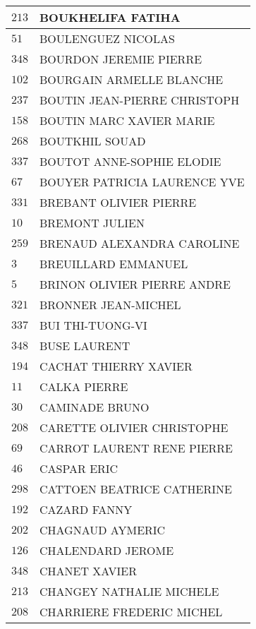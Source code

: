 \begin{xltabular}{\linewidth}{|l|X|}
    \hline
    $213$ & BOUKHELIFA FATIHA \\
    \hline
    $51$ & BOULENGUEZ NICOLAS \\
    \hline
    $348$ & BOURDON JEREMIE PIERRE \\
    \hline
    $102$ & BOURGAIN ARMELLE BLANCHE \\
    \hline
    $237$ & BOUTIN JEAN-PIERRE CHRISTOPH \\
    \hline
    $158$ & BOUTIN MARC XAVIER MARIE \\
    \hline
    $268$ & BOUTKHIL SOUAD \\
    \hline
    $337$ & BOUTOT ANNE-SOPHIE ELODIE \\
    \hline
    $67$ & BOUYER PATRICIA LAURENCE YVE \\
    \hline
    $331$ & BREBANT OLIVIER PIERRE \\
    \hline
    $10$ & BREMONT JULIEN \\
    \hline
    $259$ & BRENAUD ALEXANDRA CAROLINE \\
    \hline
    $3$ & BREUILLARD EMMANUEL \\
    \hline
    $5$ & BRINON OLIVIER PIERRE ANDRE \\
    \hline
    $321$ & BRONNER JEAN-MICHEL \\
    \hline
    $337$ & BUI THI-TUONG-VI \\
    \hline
    $348$ & BUSE LAURENT \\
    \hline
    $194$ & CACHAT THIERRY XAVIER \\
    \hline
    $11$ & CALKA PIERRE \\
    \hline
    $30$ & CAMINADE BRUNO \\
    \hline
    $208$ & CARETTE OLIVIER CHRISTOPHE \\
    \hline
    $69$ & CARROT LAURENT RENE PIERRE \\
    \hline
    $46$ & CASPAR ERIC \\
    \hline
    $298$ & CATTOEN BEATRICE CATHERINE \\
    \hline
    $192$ & CAZARD FANNY \\
    \hline
    $202$ & CHAGNAUD AYMERIC \\
    \hline
    $126$ & CHALENDARD JEROME \\
    \hline
    $348$ & CHANET XAVIER \\
    \hline
    $213$ & CHANGEY NATHALIE MICHELE \\
    \hline
    $208$ & CHARRIERE FREDERIC MICHEL \\
    \hline

\end{xltabular}
